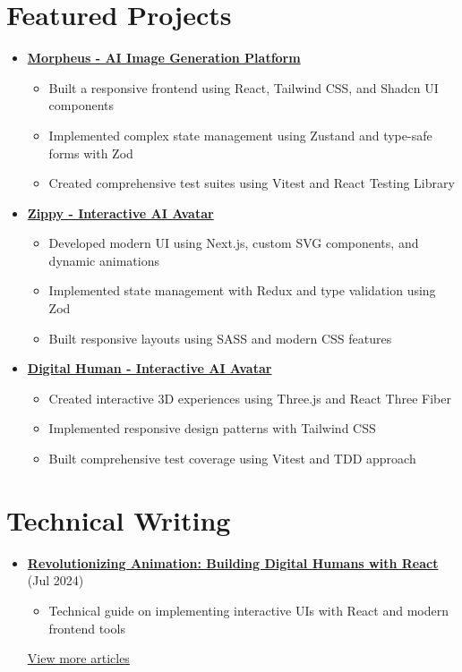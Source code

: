 \documentclass[letterpaper,11pt]{article}
\begin{document}
\section{Featured Projects}
\begin{itemize}[leftmargin=*]
    \item \textbf{\href{https://github.com/Monadical-SAS/Morpheus}{Morpheus - AI Image Generation Platform \faExternalLink}}
    \begin{itemize}
        \item Built a responsive frontend using React, Tailwind CSS, and Shadcn UI components
        \item Implemented complex state management using Zustand and type-safe forms with Zod
        \item Created comprehensive test suites using Vitest and React Testing Library
    \end{itemize}
    
    \item \textbf{\href{https://github.com/asanchezyali/ai-avatar}{Zippy - Interactive AI Avatar \faExternalLink}}
    \begin{itemize}
        \item Developed modern UI using Next.js, custom SVG components, and dynamic animations
        \item Implemented state management with Redux and type validation using Zod
        \item Built responsive layouts using SASS and modern CSS features
    \end{itemize}

    \item \textbf{\href{https://github.com/asanchezyali/talking-avatar-with-ai}{Digital Human - Interactive AI Avatar \faExternalLink}}
    \begin{itemize}
        \item Created interactive 3D experiences using Three.js and React Three Fiber
        \item Implemented responsive design patterns with Tailwind CSS
        \item Built comprehensive test coverage using Vitest and TDD approach
    \end{itemize}
\end{itemize}

\section{Technical Writing}
\begin{itemize}[leftmargin=*]    
    \item \textbf{\href{https://www.asanchezyali.com/blog/ai-avatars/20240703DigitalHuman}{Revolutionizing Animation: Building Digital Humans with React}} (Jul 2024)
    \begin{itemize}
        \item Technical guide on implementing interactive UIs with React and modern frontend tools
    \end{itemize}
    
    \href{https://www.asanchezyali.com/}{View more articles \faExternalLink}
\end{itemize}
\end{document}
